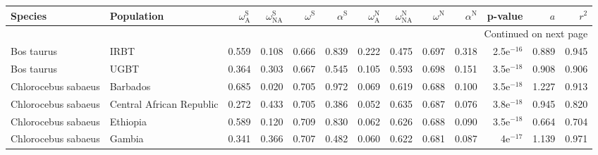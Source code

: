 \begin{longtable}{llrrrrrrrrrrr}
\toprule
             Species &                Population & $\omega_{\textrm{A}}^{\textrm{S}}$ & $\omega_{\textrm{NA}}^{\textrm{S}}$ & $\omega^{\textrm{S}}$ & $\alpha^{\textrm{S}}$ & $\omega_{\textrm{A}}^{\textrm{N}}$ & $\omega_{\textrm{NA}}^{\textrm{N}}$ & $\omega^{\textrm{N}}$ & $\alpha^{\textrm{N}}$ &      p-value &    $a$ &  $r^2$ \\
\midrule
\endhead
\midrule
\multicolumn{13}{r}{{Continued on next page}} \\
\midrule
\endfoot

\bottomrule
\endlastfoot
          Bos taurus &                      IRBT &                              0.559 &                               0.108 &                 0.666 &                 0.839 &                              0.222 &                               0.475 &                 0.697 &                 0.318 & 2.5e$^{-16}$ &  0.889 &  0.945 \\
          Bos taurus &                      UGBT &                              0.364 &                               0.303 &                 0.667 &                 0.545 &                              0.105 &                               0.593 &                 0.698 &                 0.151 & 3.5e$^{-18}$ &  0.908 &  0.906 \\
 Chlorocebus sabaeus &                  Barbados &                              0.685 &                               0.020 &                 0.705 &                 0.972 &                              0.069 &                               0.619 &                 0.688 &                 0.100 & 3.5e$^{-18}$ &  1.227 &  0.913 \\
 Chlorocebus sabaeus &  Central African Republic &                              0.272 &                               0.433 &                 0.705 &                 0.386 &                              0.052 &                               0.635 &                 0.687 &                 0.076 & 3.8e$^{-18}$ &  0.945 &  0.820 \\
 Chlorocebus sabaeus &                  Ethiopia &                              0.589 &                               0.120 &                 0.709 &                 0.830 &                              0.062 &                               0.626 &                 0.688 &                 0.090 & 3.5e$^{-18}$ &  0.664 &  0.704 \\
 Chlorocebus sabaeus &                    Gambia &                              0.341 &                               0.366 &                 0.707 &                 0.482 &                              0.060 &                               0.622 &                 0.681 &                 0.087 &   4e$^{-17}$ &  1.139 &  0.971 \\

\end{longtable}

